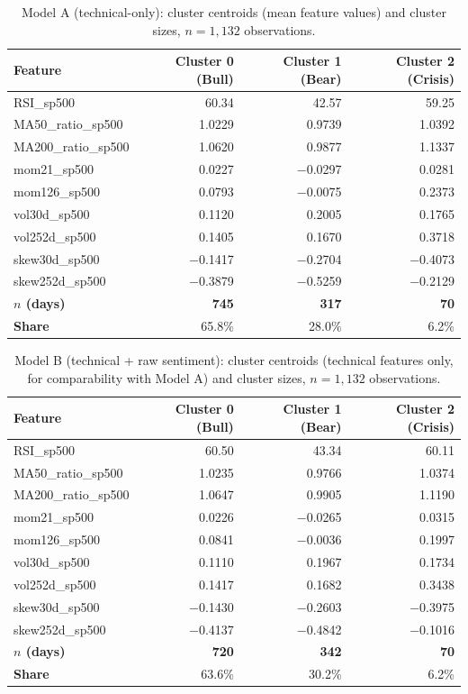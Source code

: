 \begin{table}[H]
\centering
\caption{Model A (technical-only): cluster centroids (mean feature values) and cluster sizes, $n=1{,}132$ observations.}
\label{tab:centroids-modelA}
\small
\begin{tabular}{lrrr}
\toprule
\textbf{Feature} & \textbf{Cluster 0 (Bull)} & \textbf{Cluster 1 (Bear)} & \textbf{Cluster 2 (Crisis)} \\
\midrule
RSI\_sp500          & 60.34 & 42.57 & 59.25 \\
MA50\_ratio\_sp500  & 1.0229 & 0.9739 & 1.0392 \\
MA200\_ratio\_sp500 & 1.0620 & 0.9877 & 1.1337 \\
mom21\_sp500        & 0.0227 & $-$0.0297 & 0.0281 \\
mom126\_sp500       & 0.0793 & $-$0.0075 & 0.2373 \\
vol30d\_sp500       & 0.1120 & 0.2005 & 0.1765 \\
vol252d\_sp500      & 0.1405 & 0.1670 & 0.3718 \\
skew30d\_sp500      & $-$0.1417 & $-$0.2704 & $-$0.4073 \\
skew252d\_sp500     & $-$0.3879 & $-$0.5259 & $-$0.2129 \\
\midrule
\textbf{$n$ (days)}  & \textbf{745} & \textbf{317} & \textbf{70} \\
\textbf{Share}       & 65.8\% & 28.0\% & 6.2\% \\
\bottomrule
\end{tabular}
\end{table}

\begin{table}[H]
\centering
\caption{Model B (technical + raw sentiment): cluster centroids (technical features only, for comparability with Model A) and cluster sizes, $n=1{,}132$ observations.}
\label{tab:centroids-modelB}
\small
\begin{tabular}{lrrr}
\toprule
\textbf{Feature} & \textbf{Cluster 0 (Bull)} & \textbf{Cluster 1 (Bear)} & \textbf{Cluster 2 (Crisis)} \\
\midrule
RSI\_sp500          & 60.50 & 43.34 & 60.11 \\
MA50\_ratio\_sp500  & 1.0235 & 0.9766 & 1.0374 \\
MA200\_ratio\_sp500 & 1.0647 & 0.9905 & 1.1190 \\
mom21\_sp500        & 0.0226 & $-$0.0265 & 0.0315 \\
mom126\_sp500       & 0.0841 & $-$0.0036 & 0.1997 \\
vol30d\_sp500       & 0.1110 & 0.1967 & 0.1734 \\
vol252d\_sp500      & 0.1417 & 0.1682 & 0.3438 \\
skew30d\_sp500      & $-$0.1430 & $-$0.2603 & $-$0.3975 \\
skew252d\_sp500     & $-$0.4137 & $-$0.4842 & $-$0.1016 \\
\midrule
\textbf{$n$ (days)}  & \textbf{720} & \textbf{342} & \textbf{70} \\
\textbf{Share}       & 63.6\% & 30.2\% & 6.2\% \\
\bottomrule
\end{tabular}
\end{table}

